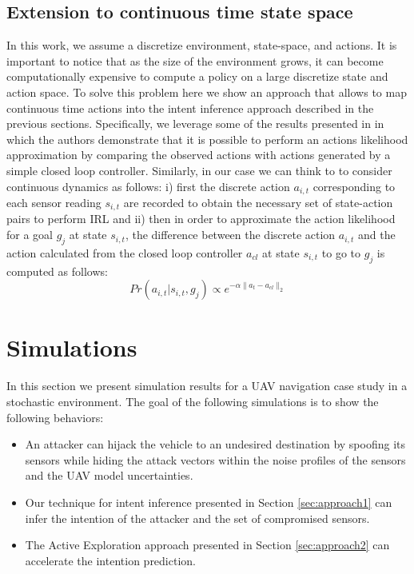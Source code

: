 \documentclass[letterpaper, 10 pt, conference]{ieeeconf}  %
\begin{document}
\subsection{Extension to continuous time state space}
In this work, we assume a discretize  environment, state-space, and actions. It is important to notice that as the size of the environment grows, it can become computationally expensive to compute a policy on a large discretize state and action space. To solve this problem here we show an approach that allows to map continuous time actions into the intent inference approach described in the previous sections. Specifically, we leverage some of the results presented in \cite{michini2013scalable} in which the authors demonstrate that it is possible to perform an actions likelihood approximation by comparing the observed actions with actions generated by a simple closed loop controller. Similarly, in our case we can think to to consider continuous dynamics as follows: i) first the discrete action $a_{i,t}$ corresponding to each sensor reading $s_{i,t}$ are recorded to obtain the necessary set of state-action pairs to perform IRL and ii) then in order to approximate the action likelihood for a goal $g_j$ at state $s_{i,t}$, the difference between the discrete action $a_{i,t}$ and the action calculated from the closed loop controller $a_{cl}$ at state $s_{i,t}$ to go to $g_j$ is computed as follows:
\begin{equation}
 Pr(a_{i,t}|s_{i,t},g_j) \propto e^{-\alpha \lVert a_t - a_{cl} \rVert_{2}}
\end{equation}

\section{Simulations}\label{sec:simulations}
In this section we present simulation results for a UAV navigation case study in a stochastic environment.
The goal of the following simulations is to show the following behaviors:
\begin{itemize}
    \item An attacker can hijack the vehicle to an undesired destination by spoofing its sensors while hiding the attack vectors within the noise profiles of the sensors and the UAV model uncertainties.
    \item Our technique for intent inference presented in Section \ref{sec:approach1} can infer the intention of the attacker and the set of compromised sensors.
    \item The Active Exploration approach presented in Section \ref{sec:approach2} can accelerate the intention prediction.
\end{itemize}
\end{document}
